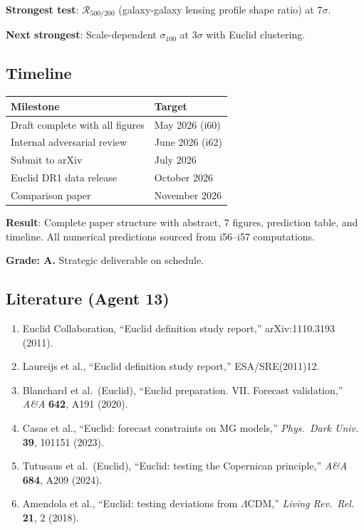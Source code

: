 \documentclass[11pt,a4paper]{article}
\begin{document}
\textbf{Strongest test}: $\mathcal{R}_{500/200}$ (galaxy-galaxy lensing profile shape ratio) at $7\sigma$.

\textbf{Next strongest}: Scale-dependent $\sigma_{100}$ at $3\sigma$ with Euclid clustering.

\subsection{Timeline}

\begin{center}
\begin{tabular}{ll}
\toprule
\textbf{Milestone} & \textbf{Target} \\
\midrule
Draft complete with all figures & May 2026 (i60) \\
Internal adversarial review & June 2026 (i62) \\
Submit to arXiv & July 2026 \\
Euclid DR1 data release & October 2026 \\
Comparison paper & November 2026 \\
\bottomrule
\end{tabular}
\end{center}

\begin{tcolorbox}[colback=green!5!white, colframe=green!60!black, title={Agent 13: Euclid Paper --- DRAFT STRUCTURE COMPLETE}]
\textbf{Result}: Complete paper structure with abstract, 7 figures, prediction table, and timeline. All numerical predictions sourced from i56--i57 computations.

\textbf{Grade: A.} Strategic deliverable on schedule.
\end{tcolorbox}

\subsection{Literature (Agent 13)}

\begin{enumerate}
\item Euclid Collaboration, ``Euclid definition study report,'' arXiv:1110.3193 (2011).
\item Laureijs et al., ``Euclid definition study report,'' ESA/SRE(2011)12.
\item Blanchard et al.\ (Euclid), ``Euclid preparation. VII. Forecast validation,'' \textit{A\&A} \textbf{642}, A191 (2020).
\item Casas et al., ``Euclid: forecast constraints on MG models,'' \textit{Phys.\ Dark Univ.} \textbf{39}, 101151 (2023).
\item Tutusaus et al.\ (Euclid), ``Euclid: testing the Copernican principle,'' \textit{A\&A} \textbf{684}, A209 (2024).
\item Amendola et al., ``Euclid: testing deviations from $\Lambda$CDM,'' \textit{Living Rev.\ Rel.} \textbf{21}, 2 (2018).
\end{enumerate}
\end{document}
